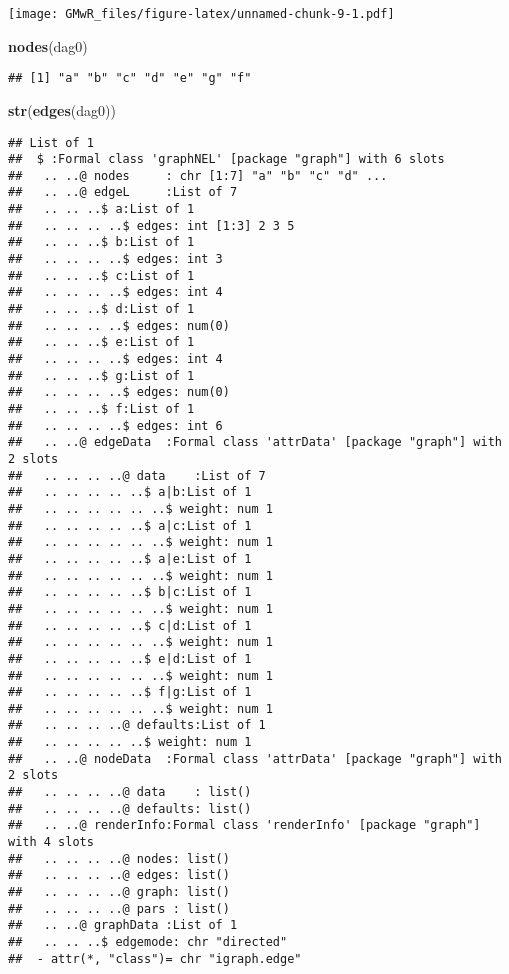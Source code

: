 \documentclass[]{article}
\newenvironment{Shaded}{\begin{snugshade}}{\end{snugshade}}
\newcommand{\KeywordTok}[1]{\textcolor[rgb]{0.13,0.29,0.53}{\textbf{#1}}}
\newcommand{\NormalTok}[1]{#1}
\begin{document}
\texttt{[image: GMwR\_files/figure-latex/unnamed-chunk-9-1.pdf]}

\begin{Shaded}
\begin{Highlighting}[]
\KeywordTok{nodes}\NormalTok{(dag0)}
\end{Highlighting}
\end{Shaded}

\begin{verbatim}
## [1] "a" "b" "c" "d" "e" "g" "f"
\end{verbatim}

\begin{Shaded}
\begin{Highlighting}[]
\KeywordTok{str}\NormalTok{(}\KeywordTok{edges}\NormalTok{(dag0))}
\end{Highlighting}
\end{Shaded}

\begin{verbatim}
## List of 1
##  $ :Formal class 'graphNEL' [package "graph"] with 6 slots
##   .. ..@ nodes     : chr [1:7] "a" "b" "c" "d" ...
##   .. ..@ edgeL     :List of 7
##   .. .. ..$ a:List of 1
##   .. .. .. ..$ edges: int [1:3] 2 3 5
##   .. .. ..$ b:List of 1
##   .. .. .. ..$ edges: int 3
##   .. .. ..$ c:List of 1
##   .. .. .. ..$ edges: int 4
##   .. .. ..$ d:List of 1
##   .. .. .. ..$ edges: num(0) 
##   .. .. ..$ e:List of 1
##   .. .. .. ..$ edges: int 4
##   .. .. ..$ g:List of 1
##   .. .. .. ..$ edges: num(0) 
##   .. .. ..$ f:List of 1
##   .. .. .. ..$ edges: int 6
##   .. ..@ edgeData  :Formal class 'attrData' [package "graph"] with 2 slots
##   .. .. .. ..@ data    :List of 7
##   .. .. .. .. ..$ a|b:List of 1
##   .. .. .. .. .. ..$ weight: num 1
##   .. .. .. .. ..$ a|c:List of 1
##   .. .. .. .. .. ..$ weight: num 1
##   .. .. .. .. ..$ a|e:List of 1
##   .. .. .. .. .. ..$ weight: num 1
##   .. .. .. .. ..$ b|c:List of 1
##   .. .. .. .. .. ..$ weight: num 1
##   .. .. .. .. ..$ c|d:List of 1
##   .. .. .. .. .. ..$ weight: num 1
##   .. .. .. .. ..$ e|d:List of 1
##   .. .. .. .. .. ..$ weight: num 1
##   .. .. .. .. ..$ f|g:List of 1
##   .. .. .. .. .. ..$ weight: num 1
##   .. .. .. ..@ defaults:List of 1
##   .. .. .. .. ..$ weight: num 1
##   .. ..@ nodeData  :Formal class 'attrData' [package "graph"] with 2 slots
##   .. .. .. ..@ data    : list()
##   .. .. .. ..@ defaults: list()
##   .. ..@ renderInfo:Formal class 'renderInfo' [package "graph"] with 4 slots
##   .. .. .. ..@ nodes: list()
##   .. .. .. ..@ edges: list()
##   .. .. .. ..@ graph: list()
##   .. .. .. ..@ pars : list()
##   .. ..@ graphData :List of 1
##   .. .. ..$ edgemode: chr "directed"
##  - attr(*, "class")= chr "igraph.edge"
\end{verbatim}
\end{document}
